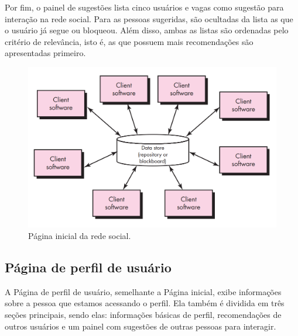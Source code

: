 \documentclass[cic,tc]{iiufrgs}
\begin{document}
Por fim, o painel de sugestões lista cinco usuários e vagas como sugestão para interação na rede social. Para as pessoas sugeridas, são ocultadas da lista as que o usuário já segue ou bloqueou. Além disso, ambas as listas são ordenadas pelo critério de relevância, isto é, as que possuem mais recomendações são apresentadas primeiro.

\begin{figure}[ht]
    \caption{Página inicial da rede social.}
        \begin{center}
            \includegraphics[width=1\textwidth]{figuras/arquitetura-centralizada-dados.png}
        \end{center}
    \label{telaHome}
\end{figure}

\subsection{Página de perfil de usuário}
\label{PDVFunProfile}

A Página de perfil de usuário, semelhante a Página inicial, exibe informações sobre a pessoa que estamos acessando o perfil. Ela também é dividida em três seções principais, sendo elas: informações básicas de perfil, recomendações de outros usuários e um painel com sugestões de outras pessoas para interagir.
\end{document}
